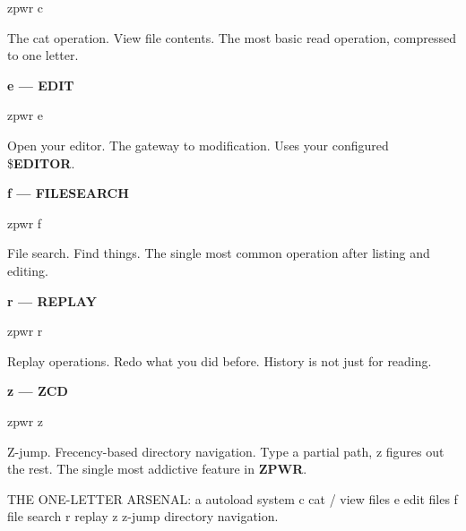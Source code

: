 \documentclass[11pt,a4paper,twoside]{book}
\begin{document}
\begin{codebox}
\color{neongreen}zpwr c\\
\end{codebox}

The cat operation. View file contents. The most basic read operation, compressed to one letter.


\vspace{12pt}
{\bfseries\color{neonyellow} e — EDIT}\vspace{4pt}

\begin{codebox}
\color{neongreen}zpwr e\\
\end{codebox}

Open your editor. The gateway to modification. Uses your configured \$\textbf{EDITOR}.


\vspace{12pt}
{\bfseries\color{neonyellow} f — FILESEARCH}\vspace{4pt}

\begin{codebox}
\color{neongreen}zpwr f\\
\end{codebox}

File search. Find things. The single most common operation after listing and editing.


\vspace{12pt}
{\bfseries\color{neonyellow} r — REPLAY}\vspace{4pt}

\begin{codebox}
\color{neongreen}zpwr r\\
\end{codebox}

Replay operations. Redo what you did before. History is not just for reading.


\vspace{12pt}
{\bfseries\color{neonyellow} z — ZCD}\vspace{4pt}

\begin{codebox}
\color{neongreen}zpwr z\\
\end{codebox}

Z-jump. Frecency-based directory navigation. Type a partial path, z figures out the rest. The single most addictive feature in \textbf{ZPWR}.

THE ONE-LETTER ARSENAL: a   autoload system c   cat / view files e   edit files f   file search r   replay z   z-jump directory navigation.
\end{document}
